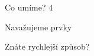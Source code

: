 \documentclass{beamer}
\begin{document}

\begin{frame}{Co umíme? 4}
 
    
\end{frame}
    



\begin{frame}{Navažujeme prvky}
 
 
 \bigskip
 
 Znáte rychlejší způsob?
 
\end{frame}
\end{document}
